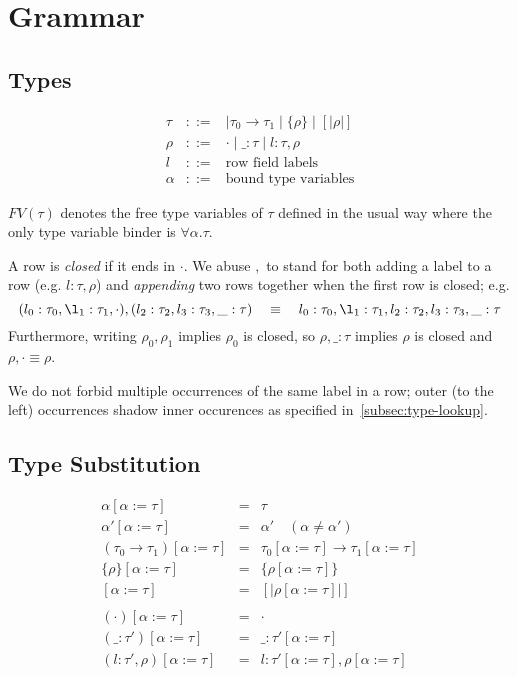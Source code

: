 \documentclass{article}
\newcommand{\define}{::=}
\newcommand{\variant}[1]{[\!|#1|\!]}
\begin{document}
\section{Grammar}

\subsection{Types}
\[\begin{array}{rcl}
\tau & \define & \mid \tau_0 \to \tau_1 \mid \{\rho\} \mid \variant{\rho}
\\
\rho & \define & \cdot \mid \_ : \tau \mid l : \tau, \rho
\\
l & \define & \text{row field labels}
\\
\alpha & \define & \text{bound type variables}
\end{array}
\]

$FV(\tau)$ denotes the free type variables of $\tau$ defined in the
usual way where the only type variable binder is $\forall\alpha.\tau$.

A row is {\it closed} if it ends in $\cdot$. We abuse $,$ to stand
for both adding a label to a row (e.g. $l:\tau,\rho$) and {\it appending}
two rows together when the first row is closed; e.g.
\[
(l_0:\tau_0,\l_1:\tau_1,\cdot),(l_2:\tau_2,l_3:\tau_3,\_:\tau)
\quad
\equiv
\quad
l_0:\tau_0,\l_1:\tau_1,l_2:\tau_2,l_3:\tau_3,\_:\tau
\]
Furthermore, writing $\rho_0,\rho_1$ implies $\rho_0$ is closed,
so $\rho,\_:\tau$ implies $\rho$ is closed and $\rho,\cdot
\equiv \rho$.

We do not forbid multiple occurrences of the same label in a row;
outer (to the left) occurrences shadow inner occurences as specified
in~\ref{subsec:type-lookup}.

\subsection{Type Substitution}
\[
\begin{array}{rcl}
  \alpha[\alpha := \tau] & = & \tau \\
  \alpha'[\alpha := \tau] & = & \alpha' \quad(\alpha \neq \alpha') \\
  (\tau_0 \to \tau_1)[\alpha := \tau] & = & \tau_0[\alpha:=\tau]\to\tau_1[\alpha:=\tau]\\
  \{\rho\}[\alpha := \tau] & = & \{\rho[\alpha:=\tau]\}\\
  \variant{\rho}[\alpha := \tau] & = & \variant{\rho[\alpha:=\tau]} \\
  \\
  (\cdot)[\alpha := \tau] & = & \cdot \\
  (\_ : \tau')[\alpha := \tau] & = & \_ : \tau'[\alpha := \tau] \\
  (l:\tau', \rho)[\alpha := \tau] & = & l:\tau'[\alpha:=\tau],\rho[\alpha:=\tau]
\end{array}
\]
\end{document}
